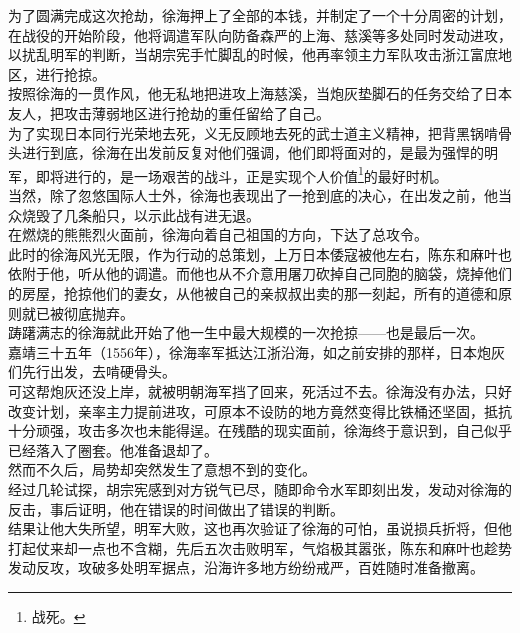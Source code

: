 \begin{multicols}{\theparacolNo}
为了圆满完成这次抢劫，徐海押上了全部的本钱，并制定了一个十分周密的计划，在战役的开始阶段，他将调遣军队向防备森严的上海、慈溪等多处同时发动进攻，以扰乱明军的判断，当胡宗宪手忙脚乱的时候，他再率领主力军队攻击浙江富庶地区，进行抢掠。\\

按照徐海的一贯作风，他无私地把进攻上海慈溪，当炮灰垫脚石的任务交给了日本友人，把攻击薄弱地区进行抢劫的重任留给了自己。\\

为了实现日本同行光荣地去死，义无反顾地去死的武士道主义精神，把背黑锅啃骨头进行到底，徐海在出发前反复对他们强调，他们即将面对的，是最为强悍的明军，即将进行的，是一场艰苦的战斗，正是实现个人价值\footnote{战死。}的最好时机。\\

当然，除了忽悠国际人士外，徐海也表现出了一抢到底的决心，在出发之前，他当众烧毁了几条船只，以示此战有进无退。\\

在燃烧的熊熊烈火面前，徐海向着自己祖国的方向，下达了总攻令。\\

此时的徐海风光无限，作为行动的总策划，上万日本倭寇被他左右，陈东和麻叶也依附于他，听从他的调遣。而他也从不介意用屠刀砍掉自己同胞的脑袋，烧掉他们的房屋，抢掠他们的妻女，从他被自己的亲叔叔出卖的那一刻起，所有的道德和原则就已被彻底抛弃。\\

踌躇满志的徐海就此开始了他一生中最大规模的一次抢掠——也是最后一次。\\

嘉靖三十五年（1556年），徐海率军抵达江浙沿海，如之前安排的那样，日本炮灰们先行出发，去啃硬骨头。\\

可这帮炮灰还没上岸，就被明朝海军挡了回来，死活过不去。徐海没有办法，只好改变计划，亲率主力提前进攻，可原本不设防的地方竟然变得比铁桶还坚固，抵抗十分顽强，攻击多次也未能得逞。在残酷的现实面前，徐海终于意识到，自己似乎已经落入了圈套。他准备退却了。\\

然而不久后，局势却突然发生了意想不到的变化。\\

经过几轮试探，胡宗宪感到对方锐气已尽，随即命令水军即刻出发，发动对徐海的反击，事后证明，他在错误的时间做出了错误的判断。\\

结果让他大失所望，明军大败，这也再次验证了徐海的可怕，虽说损兵折将，但他打起仗来却一点也不含糊，先后五次击败明军，气焰极其嚣张，陈东和麻叶也趁势发动反攻，攻破多处明军据点，沿海许多地方纷纷戒严，百姓随时准备撤离。\\


\end{multicols}
